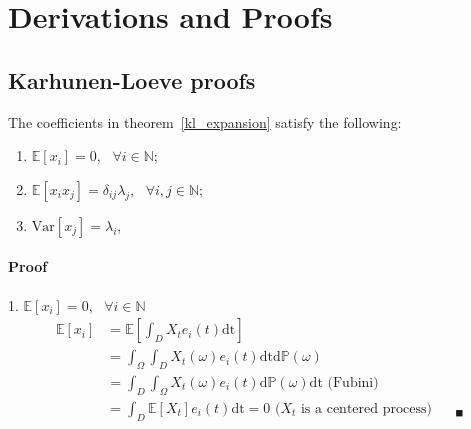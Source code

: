 
\chapter{Derivations and Proofs} %

\label{AppendixB} %


\section{Karhunen-Loeve proofs}

The coefficients in theorem~\ref{kl_expansion} satisfy the following:
\begin{enumerate}
\item $\mathbb{E}\left[x_i\right] = 0,\text{ }\forall i \in \mathbb{N}$;
\item $\mathbb{E}\left[x_i x_j\right] = \delta_{ij} \lambda_j, \text{ }\forall i,j \in \mathbb{N}$;
\item $\text{Var}\left[x_j\right] = \lambda_i$,
\end{enumerate}

\subsubsection*{Proof}

1. $\mathbb{E}\left[x_i\right] = 0,\text{ }\forall i \in \mathbb{N}$
\begin{align}
\mathbb{E}\left[x_i\right] &= \mathbb{E}\left[\int_{D} X_t e_i(t)\mathrm{dt}\right] \nonumber \\
&= \int_{\Omega}\int_{D} X_t(\omega) e_i(t)\mathrm{dt} \mathrm{d}\mathbb{P}(\omega) \nonumber \\
&= \int_{D} \int_{\Omega} X_t(\omega) e_i(t) \mathrm{d}\mathbb{P}(\omega)\mathrm{dt} \text{ (Fubini)} \nonumber \\
&= \int_{D} \mathbb{E}\left[X_t\right] e_i(t) \mathrm{dt} = 0 \text{ ($X_t$ is a centered process)} \quad \text{  }_{\blacksquare} \nonumber
\end{align}

